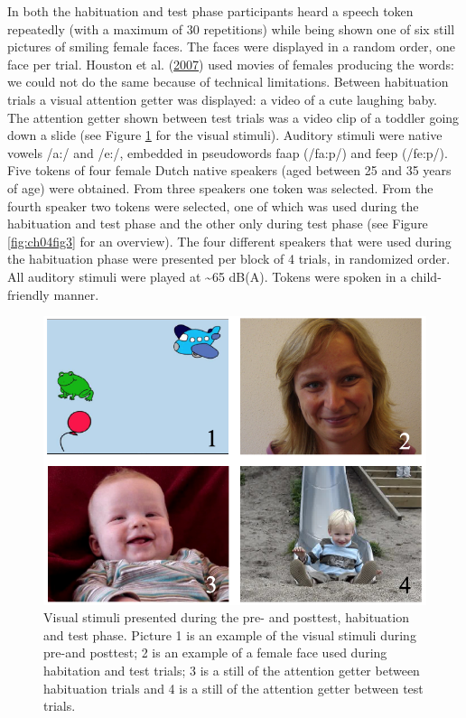 \documentclass[openright,titlepage,12pt,a4paper]{book}
\begin{document}
In both the habituation and test phase participants heard a speech token repeatedly (with a maximum of 30 repetitions) while being shown one of six still pictures of smiling female faces. The faces were displayed in a random order, one face per trial. Houston et al. (\protect\hyperlink{ref-houston_assessing_2007}{2007}) used movies of females producing the words: we could not do the same because of technical limitations. Between habituation trials a visual attention getter was displayed: a video of a cute laughing baby. The attention getter shown between test trials was a video clip of a toddler going down a slide (see Figure \ref{fig:ch04fig1} for the visual stimuli). Auditory stimuli were native vowels /a:/ and /e:/, embedded in pseudowords faap (/fa:p/) and feep (/fe:p/). Five tokens of four female Dutch native speakers (aged between 25 and 35 years of age) were obtained. From three speakers one token was selected. From the fourth speaker two tokens were selected, one of which was used during the habituation and test phase and the other only during test phase (see Figure \ref{fig:ch04fig3} for an overview). The four different speakers that were used during the habituation phase were presented per block of 4 trials, in randomized order. All auditory stimuli were played at \textasciitilde65 dB(A). Tokens were spoken in a child-friendly manner.

\begin{figure}

{\centering \includegraphics[width=0.7\linewidth]{figures/chapter_4/Figure1} 

}

\caption{Visual stimuli presented during the pre- and posttest, habituation and test phase. Picture 1 is an example of the visual stimuli during pre-and posttest; 2 is an example of a female face used during habitation and test trials; 3 is a still of the attention getter between habituation trials and 4 is a still of the attention getter between test trials.}\label{fig:ch04fig1}
\end{figure}
\end{document}
